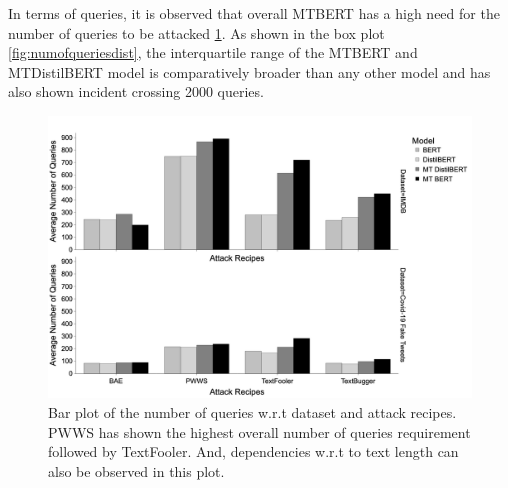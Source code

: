 \documentclass[%
	BCOR=8mm, %
	DIV=12,
	toc=bibliography, %
	toc=listof, %
	oneside, %
	egregdoesnotlikesansseriftitles, %
	]{scrbook}
\begin{document}
In terms of queries, it is observed that overall MTBERT has a high need for the number of queries to be attacked \ref{fig:avgnquebyattackrecipes}. As shown in the box plot \ref{fig:numofqueriesdist}, the interquartile range of the MTBERT and MTDistilBERT model is comparatively broader than any other model and has also shown incident crossing 2000 queries. \\

\begin{figure}[H]
	\centering
    \includegraphics[width=.78\linewidth]{img/AvgNQuebyDataset}
	\caption[Bar plot of the number of queries]{Bar plot of the number of queries w.r.t dataset and attack recipes. PWWS has shown the highest overall number of queries requirement followed by TextFooler.  And, dependencies w.r.t to text length can also be observed in this plot.}
	\label{fig:avgnquebyattackrecipes}
\end{figure}
\end{document}
